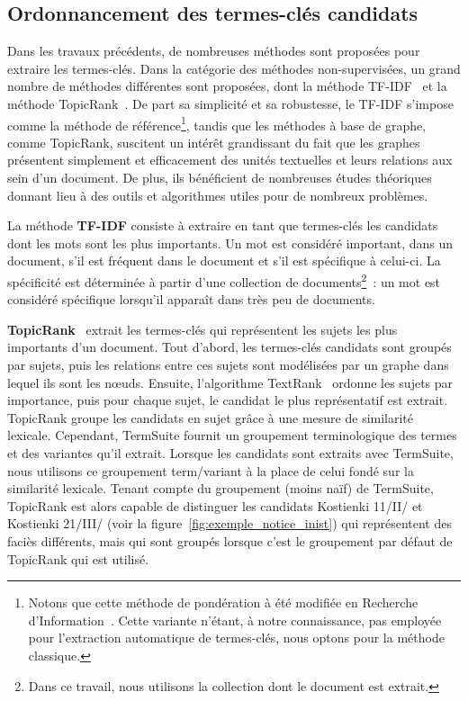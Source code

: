   \subsection{Ordonnancement des termes-clés candidats}
  \label{subsec:extraction_de_termes_cles}
    Dans les travaux précédents, de nombreuses méthodes sont proposées pour
    extraire les termes-clés. Dans la catégorie des méthodes non-supervisées, un
    grand nombre de méthodes différentes sont proposées, dont la méthode
    TF-IDF~\cite{jones1972tfidf} et la méthode
    TopicRank~\cite{bougouin2013topicrank}. De part sa simplicité et sa
    robustesse, le TF-IDF s'impose comme la méthode de référence\footnote{Notons
    que cette méthode de pondération à été modifiée en Recherche
    d'Information~\cite[Okapi]{robertson1999okapi,claveau2012vectorisation}.
    Cette variante n'étant, à notre connaissance, pas employée pour l'extraction
    automatique de termes-clés, nous optons pour la méthode classique.}, tandis
    que les méthodes à base de graphe, comme TopicRank, suscitent un intérêt
    grandissant du fait que les graphes présentent simplement et efficacement
    des unités textuelles et leurs relations aux sein d'un document. De plus,
    ils bénéficient de nombreuses études théoriques donnant lieu à des outils et
    algorithmes utiles pour de nombreux problèmes.

    La méthode \textbf{TF-IDF} consiste à extraire en tant que termes-clés les
    candidats dont les mots sont les plus importants. Un mot est considéré
    important, dans un document, s'il est fréquent dans le document et s'il est
    spécifique à celui-ci. La spécificité est déterminée à partir d'une
    collection de documents\footnote{Dans ce travail, nous utilisons la
    collection dont le document est extrait.}~: un mot est considéré spécifique
    lorsqu'il apparaît dans très peu de documents.

    \textbf{TopicRank}~\cite{bougouin2013topicrank} extrait les termes-clés qui
    représentent les sujets les plus importants d'un document. Tout d'abord, les
    termes-clés candidats sont groupés par sujets, puis les relations entre ces
    sujets sont modélisées par un graphe dans lequel ils sont les n\oe{}uds.
    Ensuite, l'algorithme TextRank~\cite{mihalcea2004textrank} ordonne les
    sujets par importance, puis pour chaque sujet, le candidat le plus
    représentatif est extrait. TopicRank groupe les candidats en sujet grâce à
    une mesure de similarité lexicale. Cependant, TermSuite fournit un
    groupement terminologique des termes et des variantes qu'il extrait. Lorsque
    les candidats sont extraits avec TermSuite, nous utilisons ce groupement
    term/variant à la place de celui fondé sur la similarité lexicale. Tenant
    compte du groupement (moins naïf) de TermSuite, TopicRank est alors capable
    de distinguer les candidats \og{}Kostienki 11/II/\fg{} et \og{}Kostienki
    21/III/\fg{} (voir la figure~\ref{fig:exemple_notice_inist}) qui
    représentent des faciès différents, mais qui sont groupés lorsque c'est le
    groupement par défaut de TopicRank qui est utilisé.

